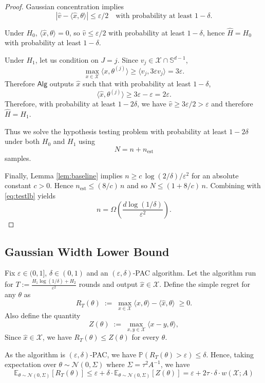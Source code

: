 \begin{proof}
Gaussian concentration implies
\[
|\widehat{v}-\langle \widehat{x},\theta\rangle|\le \varepsilon/2
\quad\text{with probability at least } 1-\delta.
\]

Under $H_0$, $\langle \widehat{x},\theta\rangle=0$, so $\widehat{v}\le \varepsilon/2$ with probability at least $1-\delta$, hence $\widehat{H}=H_0$ with probability at least $1-\delta$.

Under $H_1$, let us condition on $J=j$.
Since $v_j\in\mathcal{X}\cap\mathbb{S}^{d-1}$,
\[
\max_{x\in\mathcal{X}}\langle x,\theta^{(j)}\rangle \ge \langle v_j,3\varepsilon v_j\rangle = 3\varepsilon.
\]
Therefore $\mathsf{Alg}$ outputs $ \widehat{x}$ such that with probability at least $1-\delta$,
\[
\langle \widehat{x},\theta^{(j)}\rangle \ge 3\varepsilon-\varepsilon = 2\varepsilon.
\]
Therefore, with probability at least $1-2\delta$, we have $\widehat{v}\ge 3\varepsilon/2>\varepsilon$ and therefore $\widehat{H}=H_1$.

Thus we solve the hypothesis testing problem with probability at least $1-2\delta$ under both $H_0$ and $H_1$ using
\[
N = n+n_{\mathrm{est}}
\]
samples.

Finally, Lemma \ref{lem:baseline} implies $n\ge c\,\log(2/\delta)/\varepsilon^2$ for an absolute constant $c>0$.
Hence $n_{\mathrm{est}}\le (8/c)\,n$ and so $N\le (1+8/c)\,n $.
Combining with \eqref{eq:testlb} yields
\[
n=\Omega\!\left(\frac{d\log(1/\delta)}{\varepsilon^2}\right).
\]
\end{proof}



\subsection{Gaussian Width Lower Bound}\label{appendix:gaussian-lower-bound}
Fix $\varepsilon\in (0,1]$, $\delta\in(0,1)$ and an $(\varepsilon,\delta)$-PAC algorithm. Let the algorithm run for $T:=\frac{H_1\log(1/\delta)+H_2}{\varepsilon^2}$ rounds and output $\hat x\in \mathcal{X}$.
Define the simple regret for any $\theta$ as
\[
R_T(\theta)\;:=\;\max_{x\in \mathcal{X}}\langle x,\theta\rangle-\langle \hat x,\theta\rangle \;\ge 0.
\]
Also define the quantity
\[
Z(\theta)\;:=\;\max_{x,y\in \mathcal{X}}\langle x-y,\theta\rangle,
\]
Since $\hat x\in \mathcal{X}$, we have $R_T(\theta)\le Z(\theta)$ for every $\theta$.


As the algorithm is $(\varepsilon,\delta)$-PAC, we have $\mathbb P(R_T(\theta)>\varepsilon)\le \delta$. Hence, taking expectation over $\theta\sim\mathcal N(0,\Sigma)$ where $\Sigma=\tau^2 A^{-1}$, we have
\[
\mathbb{E}_{\theta\sim\mathcal{N}(0,\Sigma)}[R_T(\theta)]\leq \varepsilon+\delta\cdot\mathbb{E}_{\theta\sim\mathcal{N}(0,\Sigma)}[Z(\theta)]=\varepsilon+2\tau\cdot \delta\cdot w(\mathcal{X};A)
\]

